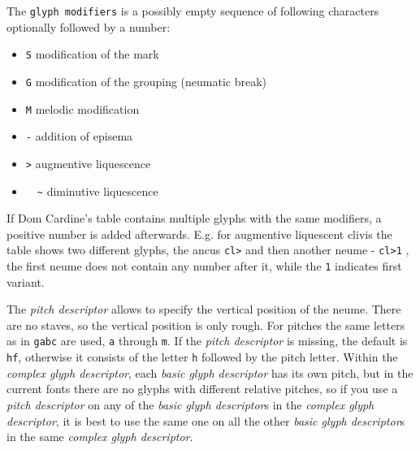 \documentclass[a4paper]{article}
\begin{document}
{The \texttt{glyph modifiers} is a possibly empty sequence of following
characters optionally followed by a number:
\begin{itemize}
  \item \texttt{S} modification of the mark
  \item \texttt{G} modification of the grouping (neumatic break)
  \item \texttt{M} melodic modification
  \item \texttt{-} addition of episema
  \item \texttt{>} augmentive liquescence
  \item ~~\texttt{\~} diminutive liquescence
\end{itemize}
If Dom Cardine's table contains multiple glyphs with the same modifiers,
a positive number is added afterwards.  E.g. for augmentive liquescent
clivis the table shows two different glyphs, the ancus \texttt{cl>} 
and then another neume - \texttt{cl>1} , the first neume does
not contain any number after it, while the \texttt{1} indicates first
variant.

The \textit{pitch descriptor} allows to specify the vertical position of the
neume.  There are no staves, so the vertical position is only rough.  For
pitches the same letters as in \texttt{gabc} are used, \texttt{a} through
\texttt{m}.  If the \textit{pitch descriptor} is missing, the default is
\texttt{hf}, otherwise it consists of the letter \texttt{h} followed by
the pitch letter.  Within the \textit{complex glyph descriptor}, each
\textit{basic glyph descriptor} has its own pitch, but in the current fonts
there are no glyphs with different relative pitches, so if you use a
\textit{pitch descriptor} on any of the \textit{basic glyph descriptor}s
in the \textit{complex glyph descriptor}, it is best to use the same one on all
the other \textit{basic glyph descriptor}s in the same \textit{complex glyph descriptor}.

}
\end{document}
